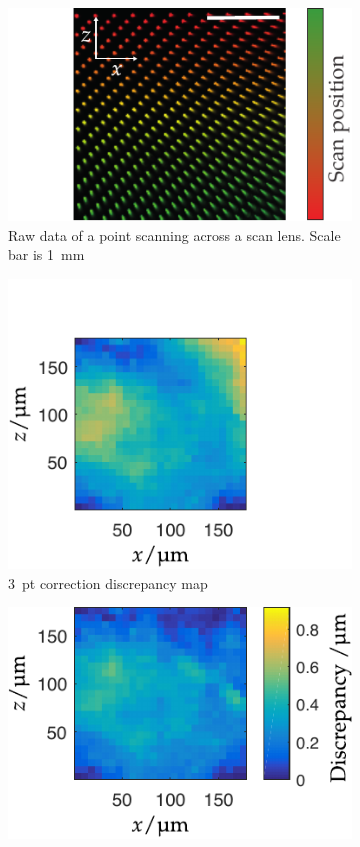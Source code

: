 \begin{figure}
	\centering
    \begin{subfigure}[t]{\textwidth}
        \centering
        \includegraphics{scan_lens/telecentric_colour/telecentric_induced_distortion_scale}
        \caption{Raw data of a point scanning across a scan lens. Scale bar is \SI{1}{\milli\meter}}
        \label{fig:scan_lens/telecentric_colour/telecentric_induced_distortion_scale}
    \end{subfigure}
    \hfill
    \begin{subfigure}[t]{0.4\textwidth}
        \centering
        \includegraphics{scan_lens/discrepancyHeatMap3pt_v2}
        \caption{3~pt correction discrepancy map}
        \label{fig:scan_lens/discrepancyHeatMap3pt_v2}
    \end{subfigure}\hspace{0.05\textwidth}
    \begin{subfigure}[t]{0.4\textwidth}
        \centering
        \includegraphics{scan_lens/discrepancyHeatMap4pt_v2}

\end{subfigure}
\end{figure}
